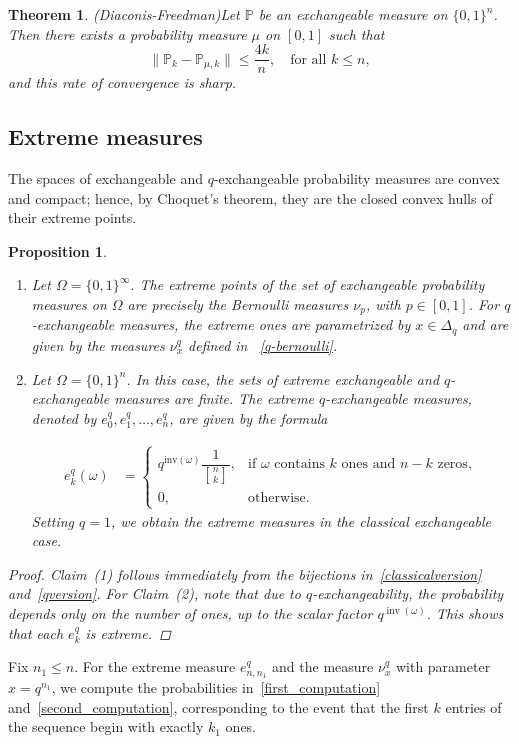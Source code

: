 \documentclass[12pt, a4paper]{amsart}
\numberwithin{equation}{subsection}
\newtheorem{thm}[equation]{Theorem}
\newtheorem{prop}[equation]{Proposition}
\theoremstyle{definition}
\newcommand{\qbinom}[3]{\genfrac{[}{]}{0pt}{}{#1}{#2}_{#3}}
\begin{document}
\begin{thm}(Diaconis-Freedman)\label{classicalfinform}
Let $\mathbb{P}$ be an exchangeable measure on $\{0, 1\}^{n}$. Then there exists a probability measure $\mu$ on $[0, 1]$ such that 
\begin{equation}
    \|\mathbb{P}_{k}-\mathbb{P}_{\mu,k}\| \leqslant \frac{4k}{n}, \quad \text{for all } k \leqslant n,
\end{equation}
and this rate of convergence is sharp.
\end{thm}

\subsection{Extreme measures} The spaces of exchangeable and $q$-exchangeable probability measures are convex and compact; hence, by Choquet's theorem, they are the closed convex hulls of their extreme points. 

\begin{prop}
\begin{enumerate}
    \item Let $\Omega = \{0, 1\}^\infty$. The extreme points of the set of exchangeable probability measures on $\Omega$ are precisely the Bernoulli measures $\nu_p$, with $p \in [0, 1]$. For $q$-exchangeable measures, the extreme ones are parametrized by $x \in \Delta_q$ and are given by the measures $\nu^q_x$ defined in ~\eqref{q-bernoulli}.
    \item Let $\Omega = \{0, 1\}^n$. In this case, the sets of extreme exchangeable and $q$-exchangeable measures are finite. The extreme $q$-exchangeable measures, denoted by $e^q_0, e^q_1, \ldots, e^q_n$, are given by the formula


   \[ \begin{aligned}
        e^{q}_k (\omega) &=
        \begin{cases}
            q^{\text{inv}(\omega)}\dfrac{1}{\qbinom{n}{k}{}}, & \text{if } \omega \text{ contains } k \text{ ones and } n-k \text{ zeros}, \\
            0, & \text{otherwise.}
        \end{cases}
    \end{aligned}\]
    Setting $q = 1$, we obtain the extreme measures in the classical exchangeable case.
\end{enumerate}
\begin{proof}
Claim~(1) follows immediately from the bijections in~\eqref{classicalversion} and~\eqref{qversion}. For Claim~(2), note that due to $q$-exchangeability, the probability depends only on the number of ones, up to the scalar factor $q^{\operatorname{inv}(\omega)}$. This shows that each $e^q_k$ is extreme.
\end{proof}
\end{prop}
Fix \( n_1 \leqslant n \). For the extreme measure \( e^{q}_{n, n_1} \) and the measure \( \nu^{q}_{x} \) with parameter \( x = q^{n_1} \), we compute the probabilities in~\eqref{first_computation} and~\eqref{second_computation}, corresponding to the event that the first \( k \) entries of the sequence begin with exactly \( k_1 \) ones.
\end{document}

